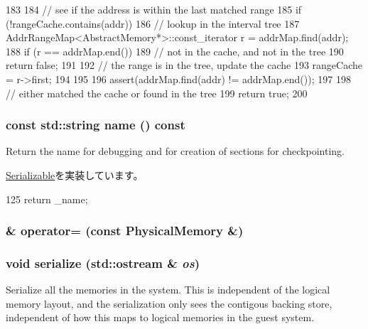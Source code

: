 \begin{DoxyCode}
183 {
184     // see if the address is within the last matched range
185     if (!rangeCache.contains(addr)) {
186         // lookup in the interval tree
187         AddrRangeMap<AbstractMemory*>::const_iterator r = addrMap.find(addr);
188         if (r == addrMap.end()) {
189             // not in the cache, and not in the tree
190             return false;
191         }
192         // the range is in the tree, update the cache
193         rangeCache = r->first;
194     }
195 
196     assert(addrMap.find(addr) != addrMap.end());
197 
198     // either matched the cache or found in the tree
199     return true;
200 }
\end{DoxyCode}
\hypertarget{classPhysicalMemory_a6490f765a824ced1cc94979609fe7e07}{
\subsubsection[{name}]{\setlength{\rightskip}{0pt plus 5cm}const std::string name () const}}
\label{classPhysicalMemory_a6490f765a824ced1cc94979609fe7e07}
Return the name for debugging and for creation of sections for checkpointing. 

\hyperlink{classSerializable_a2d319721a65496069642871a52e47056}{Serializable}を実装しています。


\begin{DoxyCode}
125 { return _name; }
\end{DoxyCode}
\hypertarget{classPhysicalMemory_a3ce2a36a848a843e660964c9bc4237e8}{
\subsubsection[{operator=}]{\& operator= (const {\bf PhysicalMemory} \&)}}
\label{classPhysicalMemory_a3ce2a36a848a843e660964c9bc4237e8}
\hypertarget{classPhysicalMemory_a53e036786d17361be4c7320d39c99b84}{
\subsubsection[{serialize}]{\setlength{\rightskip}{0pt plus 5cm}void serialize (std::ostream \& {\em os})}}
\label{classPhysicalMemory_a53e036786d17361be4c7320d39c99b84}
Serialize all the memories in the system. This is independent of the logical memory layout, and the serialization only sees the contigous backing store, independent of how this maps to logical memories in the guest system.


